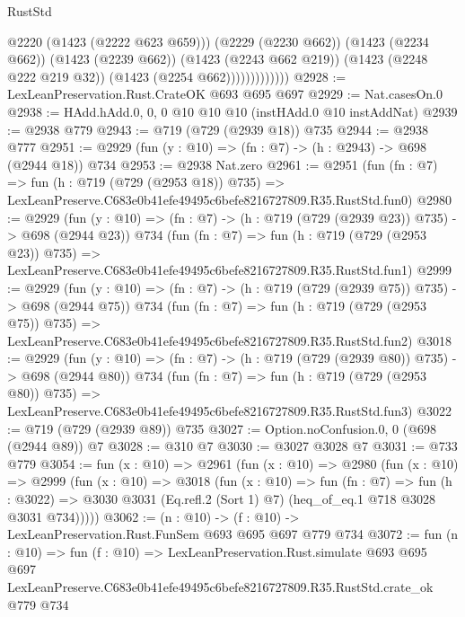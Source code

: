 \begin{lexlean}{RustStd}
\begin{coremodule}
                            @2220
                            (@1423 (@2222 @623 @659)))
                          (@2229 (@2230 @662))
                          (@1423 (@2234 @662))
                          (@1423 (@2239 @662))
                          (@1423 (@2243 @662 @219))
                          (@1423 (@2248 @222 @219 @32))
                          (@1423 (@2254 @662)))))))))))))
@2928 := LexLeanPreservation.Rust.CrateOK @693 @695 @697
@2929 := Nat.casesOn.{0}
@2938 := HAdd.hAdd.{0, 0, 0} @10 @10 @10 (instHAdd.{0} @10 instAddNat)
@2939 := @2938 @779
@2943 := @719 (@729 (@2939 @18)) @735
@2944 := @2938 @777
@2951 := @2929 (fun (y : @10) => (fn : @7) -> (h : @2943) -> @698 (@2944 @18)) @734
@2953 := @2938 Nat.zero
@2961 := @2951
    (fun (fn : @7) =>
    fun (h : @719 (@729 (@2953 @18)) @735) =>
    LexLeanPreserve.C683e0b41efe49495c6befe8216727809.R35.RustStd.fun0)
@2980 := @2929
    (fun (y : @10) => (fn : @7) -> (h : @719 (@729 (@2939 @23)) @735) -> @698 (@2944 @23))
    @734
    (fun (fn : @7) =>
    fun (h : @719 (@729 (@2953 @23)) @735) =>
    LexLeanPreserve.C683e0b41efe49495c6befe8216727809.R35.RustStd.fun1)
@2999 := @2929
    (fun (y : @10) => (fn : @7) -> (h : @719 (@729 (@2939 @75)) @735) -> @698 (@2944 @75))
    @734
    (fun (fn : @7) =>
    fun (h : @719 (@729 (@2953 @75)) @735) =>
    LexLeanPreserve.C683e0b41efe49495c6befe8216727809.R35.RustStd.fun2)
@3018 := @2929
    (fun (y : @10) => (fn : @7) -> (h : @719 (@729 (@2939 @80)) @735) -> @698 (@2944 @80))
    @734
    (fun (fn : @7) =>
    fun (h : @719 (@729 (@2953 @80)) @735) =>
    LexLeanPreserve.C683e0b41efe49495c6befe8216727809.R35.RustStd.fun3)
@3022 := @719 (@729 (@2939 @89)) @735
@3027 := Option.noConfusion.{0, 0} (@698 (@2944 @89)) @7
@3028 := @310 @7
@3030 := @3027 @3028 @7
@3031 := @733 @779
@3054 := fun (x : @10) =>
  @2961
    (fun (x : @10) =>
    @2980
      (fun (x : @10) =>
      @2999
        (fun (x : @10) =>
        @3018
          (fun (x : @10) =>
          fun (fn : @7) =>
          fun (h : @3022) =>
          @3030 @3031 (Eq.refl.{2} (Sort 1) @7) (heq_of_eq.{1} @718 @3028 @3031 @734)))))
@3062 := (n : @10) -> (f : @10) -> LexLeanPreservation.Rust.FunSem @693 @695 @697 @779 @734
@3072 := fun (n : @10) =>
  fun (f : @10) =>
  LexLeanPreservation.Rust.simulate
    @693
    @695
    @697
    LexLeanPreserve.C683e0b41efe49495c6befe8216727809.R35.RustStd.crate_ok
    @779
    @734
\end{coremodule}
\end{lexlean}
